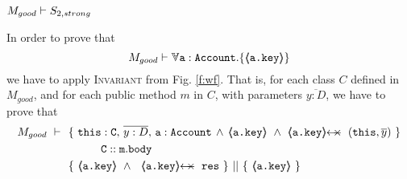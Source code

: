 \begin{lemma}
\label{lemma:exampleKeyProtect}
\label{l:Mgood:S2}
$M_{good} \vdash S_{2,strong}$
\end{lemma}
\begin{proofO}
In order to prove that 
$$M_{good} \vdash \TwoStatesN {\prg{a}:\prg{Account}}  {\inside{\prg{\prg{a.key}}}}$$
we have to apply  \textsc{Invariant} from Fig. \ref{f:wf}.
 That is, for each  class $C$  defined in $M_{good}$, and for each public method $m$ in $C$, with parameters $\overline{y:D}$, we have to prove that
 \small
\begin{align*}
M_{good}\ \vdash \ \ &   \{ \ \prg{this}:\prg{C},\, \overline{y:D},\, \prg{a}:\prg{Account}\, \wedge\,
		             {\inside{\prg{a.key}}}\ \wedge\       \protectedFrom {\prg{a.key}} {(\prg{this},\overline y)} \  \} \\
		& \SPT  \prg{C}::\prg{m}.\prg{body}\  \\
		&
                   \{\ {\inside{\prg{a.key}}}\ \wedge\ \ \protectedFrom {\prg{a.key}} {\prg{res}}   \ \}\ ||\ \{\ {\inside{\prg{a.key} } } \ \} \\
\end{align*}



\end{proofO}
